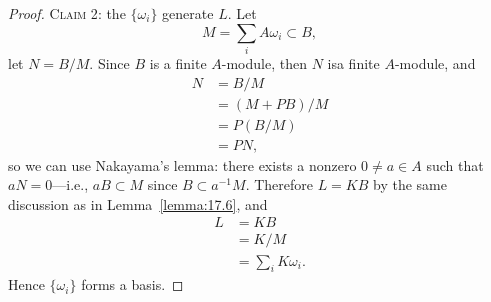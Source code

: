 \begin{proof}
\textsc{Claim 2}: the $\{\omega_{i}\}$ generate $L$. Let
\begin{equation}
M=\sum_{i}A\omega_{i}\subset B,
\end{equation}
let $N=B/M$. Since $B$ is a finite $A$-module, then $N$ isa finite
$A$-module, and
\begin{subequations}
  \begin{align}
N &= B/M\\
&=(M+PB)/M\\
&=P(B/M)\\
&=PN,
  \end{align}
\end{subequations}
so we can use Nakayama's lemma: there exists a nonzero $0\neq a\in A$
such that $aN=0$---i.e., $aB\subset M$ since $B\subset
a^{-1}M$. Therefore $L=KB$ by the same discussion as in
Lemma~\ref{lemma:17.6}, and
\begin{subequations}
  \begin{align}
    L &= KB\\
    &= K/M\\
    &=\sum_{i}K\omega_{i}.
  \end{align}
\end{subequations}
Hence $\{\omega_{i}\}$ forms a basis.
\end{proof}

